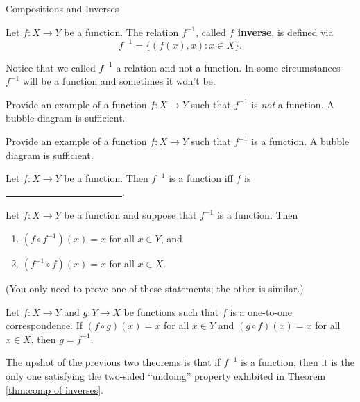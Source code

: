 \begin{section}{Compositions and Inverses}
\begin{definition}
Let $f:X\to Y$ be a function.  The relation $f^{-1}$, called \textbf{$f$ inverse}, is defined via
\[
f^{-1}=\{(f(x),x):x\in X\}.
\]
\end{definition}

\begin{remark}
Notice that we called $f^{-1}$ a relation and not a function.  In some circumstances $f^{-1}$ will be a function and sometimes it won't be.
\end{remark}

\begin{exercise}
Provide an example of a function $f:X\to Y$ such that $f^{-1}$ is \emph{not} a function.  A bubble diagram is sufficient.
\end{exercise}

\begin{exercise}
Provide an example of a function $f:X\to Y$ such that $f^{-1}$ is a function. A bubble diagram is sufficient.
\end{exercise}

\begin{theorem}
Let $f:X\to Y$ be a function.  Then $f^{-1}$ is a function iff $f$ is \underline{\ \ \ \ \ \ \ \ \ \ \ \ \ \ \ \ \ \ \ \ \ \ \ \ }.
\end{theorem}

\begin{theorem}\label{thm:comp of inverses}
Let $f:X\to Y$ be a function and suppose that $f^{-1}$ is a function.  Then
\begin{enumerate}
\item $(f\circ f^{-1})(x)=x$ for all $x\in Y$, and
\item $(f^{-1}\circ f)(x)=x$ for all $x\in X$.
\end{enumerate}
(You only need to prove one of these statements; the other is similar.)
\end{theorem}

\begin{theorem}\label{thm:unique inverse}
Let $f:X\to Y$ and $g:Y\to X$ be functions such that $f$ is a one-to-one correspondence.  If $(f\circ g)(x)=x$ for all $x\in Y$ and $(g\circ f)(x)=x$ for all $x\in X$, then $g=f^{-1}$.
\end{theorem}

\begin{remark}
The upshot of the previous two theorems is that if $f^{-1}$ is a function, then it is the only one satisfying the two-sided ``undoing'' property exhibited in Theorem \ref{thm:comp of inverses}.
\end{remark}


\end{section}

